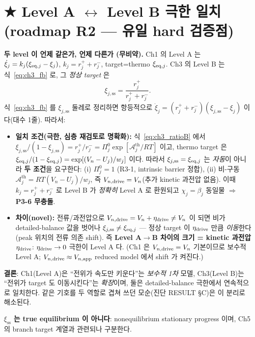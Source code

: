 \section{★ Level A $\leftrightarrow$ Level B 극한 일치 (roadmap R2 — 유일 hard 검증점)}\label{sec:reconcile}
\begin{keybox}
\textbf{두 level 이 언제 같은가, 언제 다른가 (무비약).}
Ch1 의 Level A 는 $\dot\xi_j=k_j(\xi_{\mathrm{eq},j}-\xi_j)$, $k_j=r_j^++r_j^-$, target=thermo $\xi_{\mathrm{eq},j}$.
Ch3 의 Level B 는 식~\eqref{eq:ch3_fb} 로, 그 \emph{정상 target} 은
\begin{equation}
\xi_{j,\mathrm{ss}}=\frac{r_j^+}{r_j^++r_j^-}.
\label{eq:ch3_xiss}
\end{equation}
식~\eqref{eq:ch3_fb} 를 $\xi_{j,\mathrm{ss}}$ 둘레로 정리하면 항등적으로
$\dot\xi_j=(r_j^++r_j^-)(\xi_{j,\mathrm{ss}}-\xi_j)$ 이다(대수 1줄). 따라서:
\begin{itemize}[leftmargin=1.4em]
\item \textbf{일치 조건(극한, 심층 재검토로 명확화):} 식~\eqref{eq:ch3_ratioB} 에서
  $\xi_{j,\mathrm{ss}}/(1-\xi_{j,\mathrm{ss}})=r_j^+/r_j^-=\Pi_j^0\exp[\mathcal A_j^{\mathrm{th}}/RT]$ 이고,
  thermo target 은 $\xi_{\mathrm{eq},j}/(1-\xi_{\mathrm{eq},j})=\exp[(V_n-U_j)/w_j]$ 이다. 따라서
  $\xi_{j,\mathrm{ss}}=\xi_{\mathrm{eq},j}$ 는 \emph{자동}이 아니라 \textbf{두 조건}을 요구한다: (i) $\Pi_j^0=1$
  (R3-1, intrinsic barrier 정합), (ii) 비-구동 $\mathcal A_j^{\mathrm{th}}=RT(V_n-U_j)/w_j$, 즉
  \textbf{$V_{n,\mathrm{drive}}=V_n$}(추가 kinetic 과전압 없음). 이때 $k_j=r_j^++r_j^-$ 로 Level B 가 \emph{정확히}
  Level A 로 환원되고 $\chi_j=\beta_j$ 동일물 $\Rightarrow$ \textbf{P3-6 무충돌}.
\item \textbf{차이(novel):} 전류/과전압으로 $V_{n,\mathrm{drive}}=V_n+\eta_{\mathrm{drive}}\ne V_n$ 이 되면 비가
  detailed-balance 값을 벗어나 $\xi_{j,\mathrm{ss}}\ne\xi_{\mathrm{eq},j}$ — 정상 target 이 $\eta_{\mathrm{drive}}$ 만큼
  \emph{이동}한다(peak 위치의 전류 의존 shift). 즉 \textbf{Level A$\to$B 차이의 크기 = kinetic 과전압
  $\eta_{\mathrm{drive}}$}: $\eta_{\mathrm{drive}}\to0$ 극한이 Level A 다. (Ch1 은 $V_{n,\mathrm{drive}}=V_n$ 기본이므로 보수적
  Level A; $V_{n,\mathrm{drive}}\approx V_{n,\mathrm{app}}$ reduced model 에서 shift 가 켜진다.)
\end{itemize}
\textbf{결론}: Ch1(Level A)은 ``전위가 속도만 키운다''는 \emph{보수적 1차} 모델, Ch3(Level B)는
``전위가 target 도 이동시킨다''는 \emph{확장}이며, 둘은 detailed-balance 극한에서 연속적으로 일치한다.
같은 기호를 두 역할로 겹쳐 쓰던 모순(진단 RESULT \S C)은 이 분리로 해소된다.
\end{keybox}
\textbf{$\xi_{\mathrm{ss}}$ 는 true equilibrium 이 아니다}: nonequilibrium stationary progress 이며,
Ch5 의 branch target 계열과 관련되나 구분한다.

